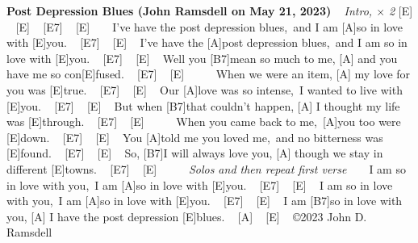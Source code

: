 \documentclass[12pt]{article}
\begin{document}
\begin{guitar}
  \textbf{Post Depression Blues (John Ramsdell on May 21, 2023)}
  ~
  \emph{Intro, $\times$ 2}
  [E] ~ [E] ~ [E7] ~ [E] ~
  ~
  I've have the post depression blues,\
  and I am [A]so in love with [E]you. ~ [E7] ~ [E] ~
  I've have the [A]post depression blues,\
  and I am so in love with [E]you. ~ [E7] ~ [E] ~
  Well you [B7]mean so much to me, [A]
  and you have me so con[E]fused. ~ [E7] ~ [E] ~
  ~
  ~
  When we were an item, [A]
  my love for you was [E]true. ~ [E7] ~ [E] ~
  Our [A]love was so intense,\
  I wanted to live with [E]you. ~ [E7] ~ [E] ~
  But when [B7]that couldn't happen, [A]
  I thought my life was [E]through. ~ [E7] ~ [E] ~
  ~
  ~
  When you came back to me,\
  [A]you too were [E]down. ~ [E7] ~ [E] ~
  You [A]told me you loved me,\
  and no bitterness was [E]found. ~ [E7] ~ [E] ~
  So, [B7]I will always love you, [A]
  though we stay in different [E]towns. ~ [E7] ~ [E] ~
  ~
  ~
  \emph{Solos and then repeat first verse}
  ~
  ~
  I am so in love with you,\
  I am [A]so in love with [E]you. ~ [E7] ~ [E] ~
  I am so in love with you,\
  I am [A]so in love with [E]you. ~ [E7] ~ [E] ~
  I am [B7]so in love with you, [A]
  I have the post depression [E]blues. ~ [A] ~ [E] ~
  \vfill
  \copyright 2023 John D. Ramsdell
\end{guitar}
\end{document}
